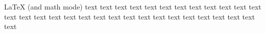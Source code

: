 \documentclass{IEEEtran}
\begin{document}
\LaTeX{} (and math mode)
text text text text text text text text text text text text text text text
text text text text text text text text text text text text text text text
\end{document}
